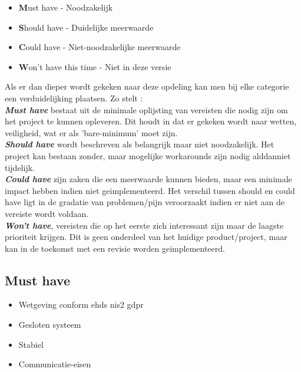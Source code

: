 \begin{itemize}
  \item \textbf{M}ust have - Noodzakelijk
  \item \textbf{S}hould have - Duidelijke meerwaarde
  \item \textbf{C}ould have - Niet-noodzakelijke meerwaarde
  \item \textbf{W}on't have this time - Niet in deze versie
\end{itemize}

Als er dan dieper wordt gekeken naar deze opdeling kan men bij elke categorie een verduidelijking plaatsen. Zo stelt \textcite{2025agile}:\\

\textbf{\textit{Must have}} bestaat uit de minimale oplijsting van vereisten die nodig zijn om het project te kunnen opleveren. Dit houdt in dat er gekeken wordt naar wetten, veiligheid, wat er als 'bare-minimum' moet zijn.\\

\textbf{\textit{Should have}} wordt beschreven als belangrijk maar niet noodzakelijk. Het project kan bestaan zonder, maar mogelijke workarounds zijn nodig alddanniet tijdelijk.\\

\textbf{\textit{Could have}} zijn zaken die een meerwaarde kunnen bieden, maar een minimale impact hebben indien niet geimplementeerd. Het verschil tussen should en could have ligt in de gradatie van problemen/pijn veroorzaakt indien er niet aan de vereiste wordt voldaan.\\

\textbf{\textit{Won't have}}, vereisten die op het eerste zich interessant zijn maar de laagste prioriteit krijgen. Dit is geen onderdeel van het huidige product/project, maar kan in de toekomst met een revisie worden geimplementeerd.\\

\subsection{Must have}
\label{sec:Must-have}

\begin{itemize}
  \item Wetgeving conform
  \subitem \gls{ehds}
  \subitem \gls{nis2}
  \subitem \gls{gdpr}
  \item Gesloten systeem
  \item Stabiel
  \item Communicatie-eisen
\end{itemize}

